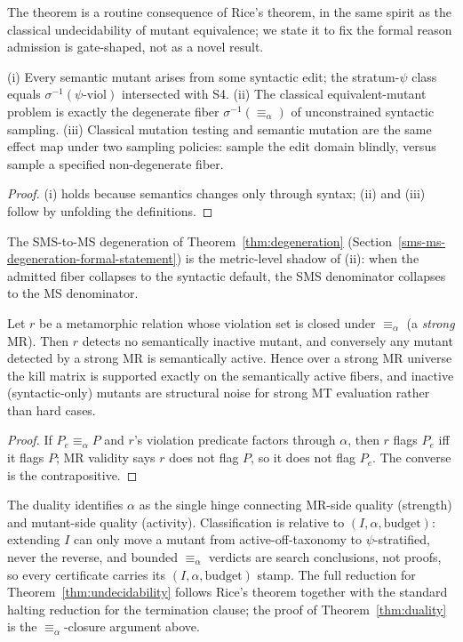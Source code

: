 \documentclass[manuscript,screen,review]{acmart}
\begin{document}
The theorem is a routine consequence of Rice's theorem, in the same
spirit as the classical undecidability of mutant equivalence; we state
it to fix the formal reason admission is gate-shaped, not as a novel
result.

\begin{proposition}\label{prop:fiber}
(i) Every semantic mutant arises from some syntactic edit; the
stratum-$\psi$ class equals $\sigma^{-1}(\psi\text{-viol})$ intersected
with S4. (ii) The classical equivalent-mutant problem is exactly the
degenerate fiber $\sigma^{-1}(\equiv_\alpha)$ of unconstrained syntactic
sampling. (iii) Classical mutation testing and semantic mutation are the
same effect map under two sampling policies: sample the edit domain
blindly, versus sample a specified non-degenerate fiber.
\end{proposition}

\begin{proof}
(i) holds because semantics changes only through syntax; (ii) and (iii)
follow by unfolding the definitions.
\end{proof}

The SMS-to-MS degeneration of
Theorem~\ref{thm:degeneration} (Section~\ref{sms-ms-degeneration-formal-statement}) is the metric-level shadow of (ii): when the admitted
fiber collapses to the syntactic default, the SMS denominator collapses
to the MS denominator.

\begin{theorem}\label{thm:duality}
Let $r$ be a
metamorphic relation whose violation set is closed under $\equiv_\alpha$
(a \emph{strong} MR). Then $r$ detects no semantically inactive
mutant, and conversely any mutant detected by a strong MR is
semantically active. Hence over a strong MR universe the kill matrix
is supported exactly on the semantically active fibers, and inactive
(syntactic-only) mutants are structural noise for strong MT evaluation
rather than hard cases.
\end{theorem}

\begin{proof}
If $P_e \equiv_\alpha P$ and $r$'s
violation predicate factors through $\alpha$, then $r$ flags $P_e$ iff
it flags $P$; MR validity says $r$ does not flag $P$, so it does not
flag $P_e$. The converse is the contrapositive.
\end{proof}

The duality identifies $\alpha$ as the single hinge connecting MR-side
quality (strength) and mutant-side quality (activity). Classification
is relative to $(I, \alpha, \text{budget})$: extending $I$ can only move
a mutant from active-off-taxonomy to $\psi$-stratified, never the
reverse, and bounded $\equiv_\alpha$ verdicts are search conclusions,
not proofs, so every certificate carries its $(I, \alpha, \text{budget})$
stamp. The full reduction for Theorem~\ref{thm:undecidability} follows Rice's theorem together
with the standard halting reduction for the termination clause; the
proof of Theorem~\ref{thm:duality} is the $\equiv_\alpha$-closure argument above.
\end{document}
